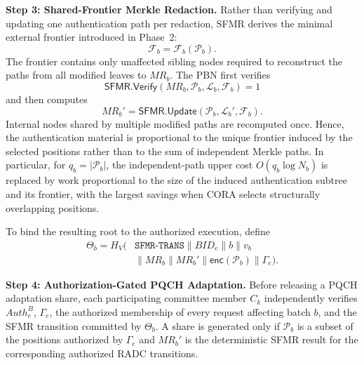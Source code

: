 \documentclass[lettersize,journal]{IEEEtran}
\begin{document}
\medskip
\noindent\textbf{Step 3: Shared-Frontier Merkle Redaction.}
Rather than verifying and updating one authentication path per
redaction, SFMR derives the minimal external frontier introduced in
Phase~2:
\begin{equation}
\mathcal{F}_b
=
\mathcal{F}_b(\mathcal{P}_b).
\end{equation}
The frontier contains only unaffected sibling nodes required to
reconstruct the paths from all modified leaves to $MR_b$. The PBN first
verifies
\begin{equation}
\mathsf{SFMR.Verify}
(MR_b,\mathcal{P}_b,\mathcal{L}_b,\mathcal{F}_b)=1
\end{equation}
and then computes
\begin{equation}
MR_b'
=
\mathsf{SFMR.Update}
(\mathcal{P}_b,\mathcal{L}_b',
\mathcal{F}_b).
\end{equation}
Internal nodes shared by multiple modified paths are recomputed once.
Hence, the authentication material is proportional to the unique
frontier induced by the selected positions rather than to the sum of
independent Merkle paths. In particular, for $q_b=|\mathcal{P}_b|$,
the independent-path upper cost $O(q_b\log N_b)$ is replaced by work
proportional to the size of the induced authentication subtree and its
frontier, with the largest savings when CORA selects structurally
overlapping positions.

To bind the resulting root to the authorized execution, define
\begin{equation}
\begin{aligned}
\Theta_b
=
H_V\big(&\texttt{SFMR-TRANS}\parallel BID_e\parallel b
\parallel v_b\\
&\parallel MR_b\parallel MR_b'
\parallel \mathsf{enc}(\mathcal{P}_b)
\parallel \Gamma_e\big).
\end{aligned}
\end{equation}

\medskip
\noindent\textbf{Step 4: Authorization-Gated PQCH Adaptation.}
Before releasing a PQCH adaptation share, each participating committee
member $C_k$ independently verifies $Auth_e^B$, $\Gamma_e$, the
authorized membership of every request affecting batch $b$, and the
SFMR transition committed by $\Theta_b$. A share is generated only if
$\mathcal{P}_b$ is a subset of the positions authorized by
$\Gamma_e$ and $MR_b'$ is the deterministic SFMR result for the
corresponding authorized RADC transitions.
\end{document}
